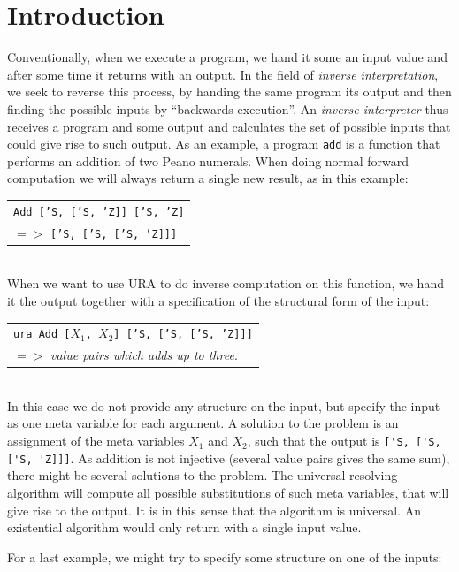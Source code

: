 \documentclass[10pt]{../sigplanconf}
\begin{document}
\newpage
\section{Introduction}
Conventionally, when we execute a program, we hand it some an input
value and after some time it returns with an output. In the field of
\textit{inverse interpretation}, we seek to reverse this process, by
handing the same program its output and then finding the possible
inputs by ``backwards execution''. An \textit{inverse interpreter}
thus receives a program and some output and calculates the set of
possible inputs that could give rise to such output. As an example, a
program \texttt{add} is a function that performs an addition of two
Peano numerals. When doing normal forward computation we will
always return a single new result, as in this example:\\

\begin{tabular}{l}
\texttt{Add ['S, ['S, 'Z]] ['S, 'Z]} \\
\quad $=>$ \texttt{['S, ['S, ['S, 'Z]]]}
\end{tabular}\\

When we want to use URA to do inverse computation on this function, we
hand it the output together with a specification of the structural
form of the input:\\

\begin{tabular}{l}
  \texttt{ura Add [$X_1$, $X_2$] ['S, ['S, ['S, 'Z]]]} \\
   \quad $=>$ \textit{value pairs which adds up to three}.
\end{tabular}\\

In this case we do not provide any structure on the input, but specify
the input as one meta variable for each argument. A solution to the
problem is an assignment of the meta variables $X_1$ and $X_2$, such
that the output is \verb|['S, ['S, ['S, 'Z]]]|. As addition is not
injective (several value pairs gives the same sum), there might be
several solutions to the problem. The universal resolving algorithm
will compute all possible substitutions of such meta variables, that
will give rise to the output. It is in this sense that the algorithm
is universal. An existential algorithm would only return with a single
input value.

For a last example, we might try to specify some structure on one of
the inputs:\\
\end{document}
